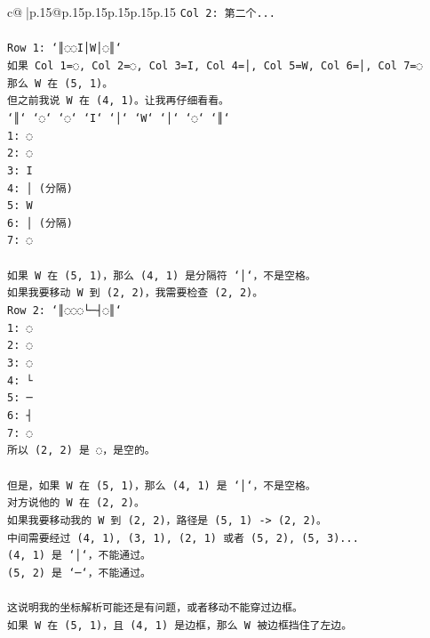 \documentclass{article}
\begin{document}
{\begin{supertabular}{c@{$\;$}|p{.15\linewidth}@{}p{.15\linewidth}p{.15\linewidth}p{.15\linewidth}p{.15\linewidth}p{.15\linewidth}}
{{{\texttt{Col 2: 第二个...} \\
\\ 
\texttt{Row 1: `║◌◌I│W│◌║`} \\
\texttt{如果 Col 1=◌, Col 2=◌, Col 3=I, Col 4=│, Col 5=W, Col 6=│, Col 7=◌} \\
\texttt{那么 W 在 (5, 1)。} \\
\texttt{但之前我说 W 在 (4, 1)。让我再仔细看看。} \\
\texttt{`║` `◌` `◌` `I` `│` `W` `│` `◌` `║`} \\
\texttt{1: ◌} \\
\texttt{2: ◌} \\
\texttt{3: I} \\
\texttt{4: │ (分隔)} \\
\texttt{5: W} \\
\texttt{6: │ (分隔)} \\
\texttt{7: ◌} \\
\\ 
\texttt{如果 W 在 (5, 1)，那么 (4, 1) 是分隔符 `│`，不是空格。} \\
\texttt{如果我要移动 W 到 (2, 2)，我需要检查 (2, 2)。} \\
\texttt{Row 2: `║◌◌◌└─┤◌║`} \\
\texttt{1: ◌} \\
\texttt{2: ◌} \\
\texttt{3: ◌} \\
\texttt{4: └} \\
\texttt{5: ─} \\
\texttt{6: ┤} \\
\texttt{7: ◌} \\
\texttt{所以 (2, 2) 是 ◌，是空的。} \\
\\ 
\texttt{但是，如果 W 在 (5, 1)，那么 (4, 1) 是 `│`，不是空格。} \\
\texttt{对方说他的 W 在 (2, 2)。} \\
\texttt{如果我要移动我的 W 到 (2, 2)，路径是 (5, 1) {-}> (2, 2)。} \\
\texttt{中间需要经过 (4, 1), (3, 1), (2, 1) 或者 (5, 2), (5, 3)...} \\
\texttt{(4, 1) 是 `│`，不能通过。} \\
\texttt{(5, 2) 是 `─`，不能通过。} \\
\\ 
\texttt{这说明我的坐标解析可能还是有问题，或者移动不能穿过边框。} \\
\texttt{如果 W 在 (5, 1)，且 (4, 1) 是边框，那么 W 被边框挡住了左边。} \\
}}}
\end{supertabular}}
\end{document}
